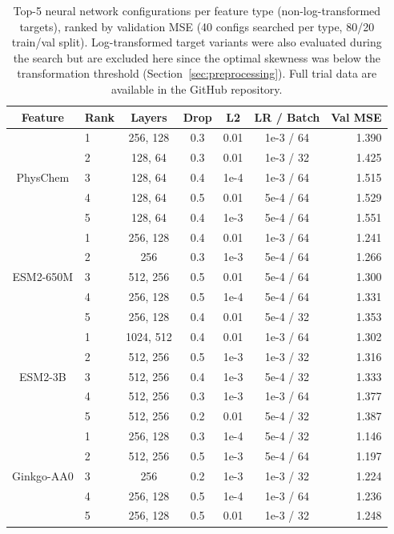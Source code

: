 \documentclass[12pt]{article}
\begin{document}
\begin{table}[H]
\centering
\caption{Top-5 neural network configurations per feature type (non-log-transformed targets), ranked by validation MSE (40 configs searched per type, 80/20 train/val split). Log-transformed target variants were also evaluated during the search but are excluded here since the optimal skewness was below the transformation threshold (Section~\ref{sec:preprocessing}). Full trial data are available in the GitHub repository.}
\label{tab:nn_trials}
\small
\begin{tabular}{clccccr}
\toprule
Feature & Rank & Layers & Drop & L2 & LR / Batch & Val MSE \\
\midrule
\multirow{5}{*}{PhysChem}
 & 1 & 256, 128 & 0.3 & 0.01 & 1e-3 / 64 & 1.390 \\
 & 2 & 128, 64 & 0.3 & 0.01 & 1e-3 / 32 & 1.425 \\
 & 3 & 128, 64 & 0.4 & 1e-4 & 1e-3 / 64 & 1.515 \\
 & 4 & 128, 64 & 0.5 & 0.01 & 5e-4 / 64 & 1.529 \\
 & 5 & 128, 64 & 0.4 & 1e-3 & 5e-4 / 64 & 1.551 \\
\midrule
\multirow{5}{*}{ESM2-650M}
 & 1 & 256, 128 & 0.4 & 0.01 & 1e-3 / 64 & 1.241 \\
 & 2 & 256 & 0.3 & 1e-3 & 5e-4 / 64 & 1.266 \\
 & 3 & 512, 256 & 0.5 & 0.01 & 5e-4 / 64 & 1.300 \\
 & 4 & 256, 128 & 0.5 & 1e-4 & 5e-4 / 64 & 1.331 \\
 & 5 & 256, 128 & 0.4 & 0.01 & 5e-4 / 32 & 1.353 \\
\midrule
\multirow{5}{*}{ESM2-3B}
 & 1 & 1024, 512 & 0.4 & 0.01 & 1e-3 / 64 & 1.302 \\
 & 2 & 512, 256 & 0.5 & 1e-3 & 1e-3 / 32 & 1.316 \\
 & 3 & 512, 256 & 0.4 & 1e-3 & 5e-4 / 32 & 1.333 \\
 & 4 & 512, 256 & 0.3 & 1e-3 & 1e-3 / 64 & 1.377 \\
 & 5 & 512, 256 & 0.2 & 0.01 & 5e-4 / 32 & 1.387 \\
\midrule
\multirow{5}{*}{Ginkgo-AA0}
 & 1 & 256, 128 & 0.3 & 1e-4 & 5e-4 / 32 & 1.146 \\
 & 2 & 512, 256 & 0.5 & 1e-3 & 5e-4 / 64 & 1.197 \\
 & 3 & 256 & 0.2 & 1e-3 & 1e-3 / 32 & 1.224 \\
 & 4 & 256, 128 & 0.5 & 1e-4 & 1e-3 / 64 & 1.236 \\
 & 5 & 256, 128 & 0.5 & 0.01 & 1e-3 / 32 & 1.248 \\
\bottomrule
\end{tabular}
\end{table}
\end{document}
